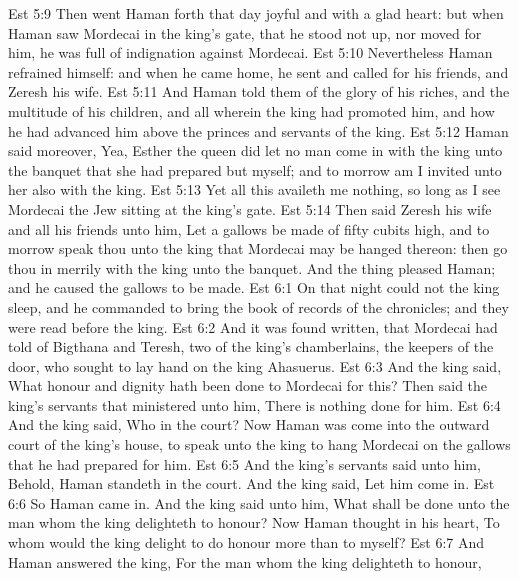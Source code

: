 \vs Est 5:9 Then went Haman forth that day joyful and with a glad heart: but when Haman saw Mordecai in the king's gate, that he stood not up, nor moved for him, he was full of indignation against Mordecai.
\vs Est 5:10 Nevertheless Haman refrained himself: and when he came home, he sent and called for his friends, and Zeresh his wife.
\vs Est 5:11 And Haman told them of the glory of his riches, and the multitude of his children, and all  wherein the king had promoted him, and how he had advanced him above the princes and servants of the king.
\vs Est 5:12 Haman said moreover, Yea, Esther the queen did let no man come in with the king unto the banquet that she had prepared but myself; and to morrow am I invited unto her also with the king.
\vs Est 5:13 Yet all this availeth me nothing, so long as I see Mordecai the Jew sitting at the king's gate.
\vs Est 5:14 Then said Zeresh his wife and all his friends unto him, Let a gallows be made of fifty cubits high, and to morrow speak thou unto the king that Mordecai may be hanged thereon: then go thou in merrily with the king unto the banquet. And the thing pleased Haman; and he caused the gallows to be made.
\vs Est 6:1 On that night could not the king sleep, and he commanded to bring the book of records of the chronicles; and they were read before the king.
\vs Est 6:2 And it was found written, that Mordecai had told of Bigthana and Teresh, two of the king's chamberlains, the keepers of the door, who sought to lay hand on the king Ahasuerus.
\vs Est 6:3 And the king said, What honour and dignity hath been done to Mordecai for this? Then said the king's servants that ministered unto him, There is nothing done for him.
\vs Est 6:4 And the king said, Who  in the court? Now Haman was come into the outward court of the king's house, to speak unto the king to hang Mordecai on the gallows that he had prepared for him.
\vs Est 6:5 And the king's servants said unto him, Behold, Haman standeth in the court. And the king said, Let him come in.
\vs Est 6:6 So Haman came in. And the king said unto him, What shall be done unto the man whom the king delighteth to honour? Now Haman thought in his heart, To whom would the king delight to do honour more than to myself?
\vs Est 6:7 And Haman answered the king, For the man whom the king delighteth to honour,
